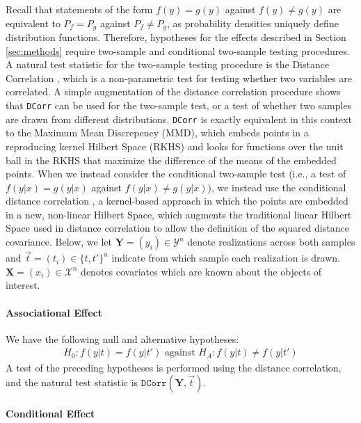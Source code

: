 \label{app:hypo_testing}
Recall that statements of the form $f(y) = g(y)$ against $f(y) \neq g(y)$ are equivalent to $P_f = P_g$ against $P_f \neq P_g$, as probability densities uniquely define distribution functions. Therefore, hypotheses for the effects described in Section \ref{sec:methods} require two-sample and conditional two-sample testing procedures. A natural test statistic for the two-sample testing procedure is the Distance Correlation \cite{Szekely2007Dec}, which is a non-parametric test for testing whether two variables are correlated. A simple augmentation of the distance correlation procedure \cite{Shen2017-ub,Vogelstein2019-zt} shows that \texttt{DCorr} can be used for the two-sample test, or a test of whether two samples are drawn from different distributions. \texttt{DCorr} is exactly equivalent in this context to the Maximum Mean Discrepency (MMD), which embeds points in a reproducing kernel Hilbert Space (RKHS) and looks for functions over the unit ball in the RKHS that maximize the difference of the means of the embedded points. When we instead consider the conditional two-sample test (i.e., a test of $f(y|x)= g(y|x)$ against $f(y|x) \neq g(y|x)$), we instead use the conditional distance correlation \cite{Wang2015}, a kernel-based approach in which the points are embedded in a new, non-linear Hilbert Space, which augments the traditional linear Hilbert Space used in distance correlation to allow the definition of the squared distance covariance. Below, we let $\mathbf Y = (y_i) \in \mathcal Y^n$ denote realizations across both samples and $\vec t = (t_i) \in \{t, t'\}^n$ indicate from which sample each realization is drawn. $\mathbf X = (x_i) \in \mathcal X^n$ denotes covariates which are known about the objects of interest.

\paragraph{Associational Effect}

We have the following null and alternative hypotheses:
\begin{align*}
    H_0 : f(y|t) = f(y|t')\text{ against }H_A: f(y|t) \neq f(y|t')
\end{align*}
A test of the preceding hypotheses is performed using the distance correlation, and the natural test statistic is $\texttt{DCorr}(\mathbf Y, \vec t)$.

\paragraph{Conditional Effect}

